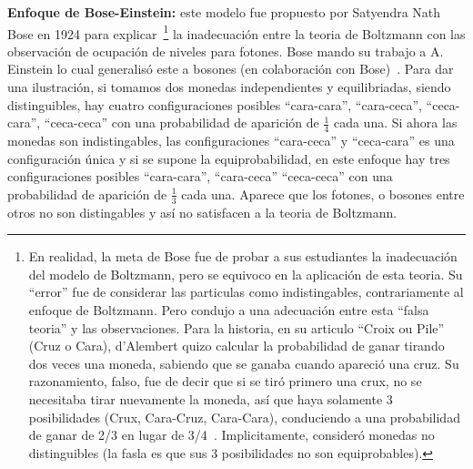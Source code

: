 {\begin{ejemplo}
  {\bf Enfoque de  Bose-Einstein:} este modelo fue propuesto  por Satyendra Nath
  Bose  en 1924  para explicar~\footnote{En  realidad, la  meta de  Bose  fue de
    probar a sus estudiantes la  inadecuaci\'on del modelo de Boltzmann, pero se
    equivoco en la  aplicaci\'on de esta teoria. Su  ``error'' fue de considerar
    las   particulas   como  indistingables,   contrariamente   al  enfoque   de
    Boltzmann. Pero condujo a una adecuaci\'on entre esta ``falsa teoria'' y las
    observaciones. Para  la historia, en su  articulo ``Croix ou  Pile'' (Cruz o
    Cara), d'Alembert quizo calcular la  probabilidad de ganar tirando dos veces
    una  moneda,  sabiendo  que  se  ganaba  cuando  apareci\'o  una  cruz.   Su
    razonamiento, falso, fue  de decir que si se tir\'o primero  una crux, no se
    necesitaba   tirar  nuevamente  la   moneda,  así   que  haya   solamente  3
    posibilidades (Crux,  Cara-Cruz, Cara-Cara), conduciendo  a una probabilidad
    de   ganar    de   2/3   en   lugar   de    3/4~\cite[``Croix   ou   Pile'',
    p.~478-479]{AleBos1784}.     Implicitamente,    consider\'o    monedas    no
    distinguibles (la fasla  es que sus 3 posibilidades  no son equiprobables).}
  la  inadecuaci\'on entre  la  teoria  de Boltzmann  con  las observaci\'on  de
  ocupaci\'on de niveles  para fotones. Bose mando su trabajo  a A.  Einstein lo
  cual generalis\'o  este a  bosones (en colaboraci\'on  con Bose)~\cite{Bos24}.
  Para  dar   una  ilustraci\'on,  si  tomamos  dos   monedas  independientes  y
  equilibriadas,  siendo  distinguibles,  hay  cuatro  configuraciones  posibles
  ``cara-cara'',    ``cara-ceca'',   ``ceca-cara'',   ``ceca-ceca''    con   una
  probabilidad de aparici\'on  de $\frac14$ cada una.  Si  ahora las monedas son
  indistingables,  las  configuraciones  ``cara-ceca''  y ``ceca-cara''  es  una
  configuraci\'on \'unica  y si se  supone la equiprobabilidad, en  este enfoque
  hay tres  configuraciones posibles ``cara-cara'',  ``cara-ceca'' ``ceca-ceca''
  con una  probabilidad de  aparici\'on de $\frac13$  cada una. Aparece  que los
  fotones, o bosones entre otros no  son distingables y as\'i no satisfacen a la
  teoria de Boltzmann.


\end{ejemplo}}
